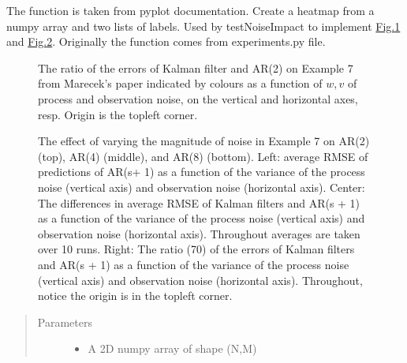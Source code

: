 \documentclass[letterpaper,10pt,english]{sphinxmanual}
\begin{document}
\begin{fulllineitems}
\label{\detokenize{LDS:LDS.OnlineLDS_library.heatmap}}
\sphinxAtStartPar
The function is taken from pyplot documentation.
Create a heatmap from a numpy array and two lists of labels.
Used by testNoiseImpact to implement \hyperref[\detokenize{LDS:fig3}]{Fig.\@ \ref{\detokenize{LDS:fig3}}} and \hyperref[\detokenize{LDS:fig6}]{Fig.\@ \ref{\detokenize{LDS:fig6}}}.
Originally the function comes from experiments.py file.

\begin{figure}[htbp]
\centering
\capstart

\noindent{}
\caption{The ratio of the errors of Kalman filter and AR(2) on Example 7 from Marecek’s paper
indicated by colours as a function of \(w, v\) of process and observation noise, on
the vertical and horizontal axes, resp. Origin is the top\sphinxhyphen{}left corner.}\label{\detokenize{LDS:id1}}\label{\detokenize{LDS:fig3}}\end{figure}

\begin{figure}[htbp]
\centering
\capstart

\noindent{}
\caption{The effect of varying the magnitude of noise in Example 7 on AR(2)
(top), AR(4) (middle), and AR(8) (bottom). Left: average RMSE of predictions
of AR(s+ 1) as a function of the variance of the process noise (vertical axis) and
observation noise (horizontal axis). Center: The differences in average RMSE of
Kalman filters and AR(s + 1) as a function of the variance of the process noise
(vertical axis) and observation noise (horizontal axis). Throughout averages are
taken over 10 runs. Right: The ratio (70) of the errors of Kalman filters and
AR(s + 1) as a function of the variance of the process noise (vertical axis) and
observation noise (horizontal axis). Throughout, notice the origin is in the topleft corner.}\label{\detokenize{LDS:id2}}\label{\detokenize{LDS:fig6}}\end{figure}
\begin{quote}\begin{description}
\item[{Parameters}] \leavevmode\begin{itemize}
\item {} 
\sphinxAtStartPar
{} \textendash{} A 2D numpy array of shape (N,M)


\end{itemize}
\end{description}
\end{quote}
\end{fulllineitems}
\end{document}

